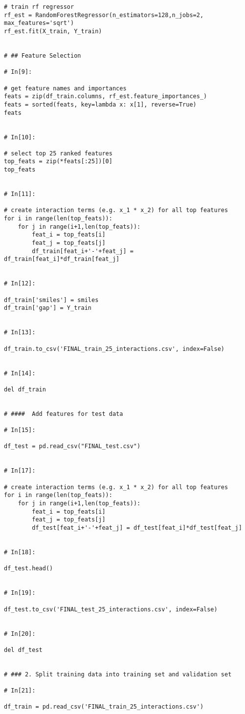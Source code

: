 \documentclass[11pt, oneside]{article}   	%
\begin{document}
\begin{lstlisting}
# train rf regressor
rf_est = RandomForestRegressor(n_estimators=128,n_jobs=2, max_features='sqrt')
rf_est.fit(X_train, Y_train)


# ## Feature Selection

# In[9]:

# get feature names and importances
feats = zip(df_train.columns, rf_est.feature_importances_)
feats = sorted(feats, key=lambda x: x[1], reverse=True)
feats


# In[10]:

# select top 25 ranked features
top_feats = zip(*feats[:25])[0]
top_feats


# In[11]:

# create interaction terms (e.g. x_1 * x_2) for all top features
for i in range(len(top_feats)):
    for j in range(i+1,len(top_feats)):
        feat_i = top_feats[i]
        feat_j = top_feats[j]
        df_train[feat_i+'-'+feat_j] = df_train[feat_i]*df_train[feat_j]


# In[12]:

df_train['smiles'] = smiles
df_train['gap'] = Y_train


# In[13]:

df_train.to_csv('FINAL_train_25_interactions.csv', index=False)


# In[14]:

del df_train


# ####  Add features for test data

# In[15]:

df_test = pd.read_csv("FINAL_test.csv")


# In[17]:

# create interaction terms (e.g. x_1 * x_2) for all top features
for i in range(len(top_feats)):
    for j in range(i+1,len(top_feats)):
        feat_i = top_feats[i]
        feat_j = top_feats[j]
        df_test[feat_i+'-'+feat_j] = df_test[feat_i]*df_test[feat_j]


# In[18]:

df_test.head()


# In[19]:

df_test.to_csv('FINAL_test_25_interactions.csv', index=False)


# In[20]:

del df_test


# ### 2. Split training data into training set and validation set

# In[21]:

df_train = pd.read_csv('FINAL_train_25_interactions.csv')



\end{lstlisting}
\end{document}
